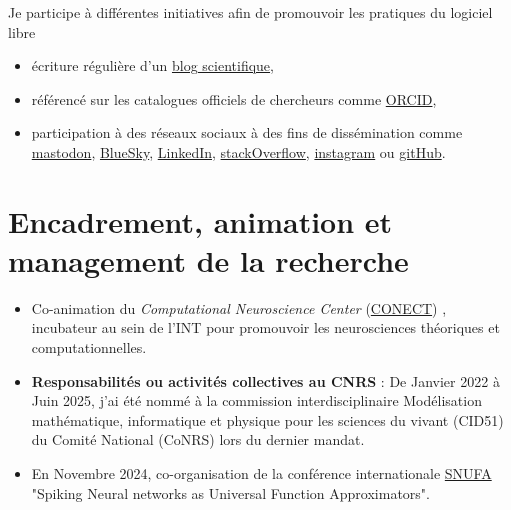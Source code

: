 \documentclass[10pt,french,a4paper]{article}%
\begin{document}
Je participe à différentes initiatives afin de promouvoir les pratiques du logiciel libre
\begin{itemize}
	\item écriture régulière d'un \href{https://laurentperrinet.github.io/sciblog/}{blog scientifique},
	\item référencé sur les catalogues officiels de chercheurs comme \href{http://orcid.org/0000-0002-9536-010X}{ORCID},
	\item participation à des réseaux sociaux à des fins de dissémination comme \href{https://neuromatch.social/@laurentperrinet}{mastodon}, \href{https://bsky.app/profile/laurentperrinet.bsky.social}{BlueSky}, \href{https://www.linkedin.com/in/laurent-perrinet-1857b9/}{LinkedIn}, \href{https://stackoverflow.com/users/234547/meduz}{stackOverflow}, \href{https://www.instagram.com/laurentperrinet/}{instagram} ou \href{https://github.com/laurentperrinet}{gitHub}.
\end{itemize}




\section{Encadrement, animation et management de la recherche}



\begin{itemize}
	
	\item Co-animation du \og \textit{Computational Neuroscience Center} (\href{https://conect-int.github.io/}{CONECT}) \fg{}, incubateur au sein de l’INT pour promouvoir les neurosciences théoriques et computationnelles.
	
    \item \textbf{Responsabilités ou activités collectives au CNRS} : De Janvier 2022 à Juin 2025, j'ai été nommé à la commission interdisciplinaire \og Modélisation mathématique, informatique et physique pour les sciences du vivant \fg{} (CID51) du Comité National (CoNRS) lors du dernier mandat.
	
	\item En Novembre 2024, co-organisation de la conférence internationale \href{https://laurentperrinet.github.io/post/2024-11-08-snufa/}{SNUFA} "Spiking Neural networks as Universal Function Approximators".
\end{itemize}
\end{document}
